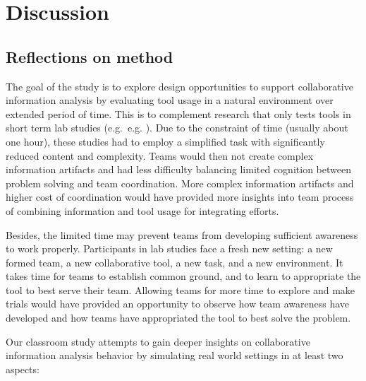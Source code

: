 \documentclass[]{article}
\date{}
\begin{document}
\section{Discussion}\label{discussion}

\subsection{Reflections on method}\label{reflections-on-method}

The goal of the study is to explore design opportunities to support
collaborative information analysis by evaluating tool usage in a natural
environment over extended period of time. This is to complement research
that only tests tools in short term lab studies (e.g.~e.g.
\autocites{Convertino2012}{Goyal2016}). Due to the constraint of time
(usually about one hour), these studies had to employ a simplified task
with significantly reduced content and complexity. Teams would then not
create complex information artifacts and had less difficulty balancing
limited cognition between problem solving and team coordination. More
complex information artifacts and higher cost of coordination would have
provided more insights into team process of combining information and
tool usage for integrating efforts.

Besides, the limited time may prevent teams from developing sufficient
awareness to work properly. Participants in lab studies face a fresh new
setting: a new formed team, a new collaborative tool, a new task, and a
new environment. It takes time for teams to establish common ground, and
to learn to appropriate the tool to best serve their team. Allowing
teams for more time to explore and make trials would have provided an
opportunity to observe how team awareness have developed and how teams
have appropriated the tool to best solve the problem.

Our classroom study attempts to gain deeper insights on collaborative
information analysis behavior by simulating real world settings in at
least two aspects:
\end{document}

